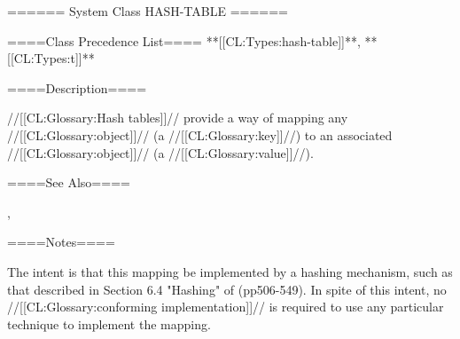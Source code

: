 ====== System Class HASH-TABLE ======

====Class Precedence List==== **[[CL:Types:hash-table]]**, **[[CL:Types:t]]**

====Description====

//[[CL:Glossary:Hash tables]]// provide a way of mapping any //[[CL:Glossary:object]]// (a //[[CL:Glossary:key]]//) to an associated //[[CL:Glossary:object]]// (a //[[CL:Glossary:value]]//).

====See Also====

{\secref\HashTableConcepts}, {\secref\PrintingOtherObjects}

====Notes====

The intent is that this mapping be implemented by a hashing mechanism, such as that described in Section 6.4 "Hashing" of {\KnuthVolThree} (pp506-549). In spite of this intent, no //[[CL:Glossary:conforming implementation]]// is required to use any particular technique to implement the mapping.

